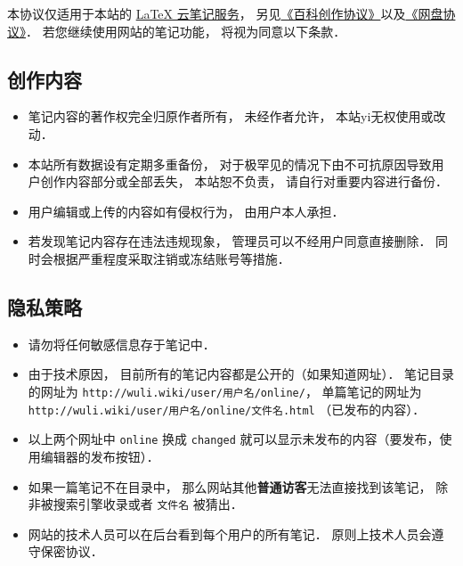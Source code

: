 
本协议仅适用于本站的 \href{http://example.com}{LaTeX 云笔记服务}， 另见\href{http://wuli.wiki/online/licens.html}{《百科创作协议》}以及\href{http://www.example.com}{《网盘协议》}． 若您继续使用网站的笔记功能， 将视为同意以下条款．

\subsection{创作内容}
\begin{itemize}
\item 笔记内容的著作权完全归原作者所有， 未经作者允许， 本站yi无权使用或改动．
\item 本站所有数据设有定期多重备份， 对于极罕见的情况下由不可抗原因导致用户创作内容部分或全部丢失， 本站恕不负责， 请自行对重要内容进行备份．
\item 用户编辑或上传的内容如有侵权行为， 由用户本人承担．
\item 若发现笔记内容存在违法违规现象， 管理员可以不经用户同意直接删除． 同时会根据严重程度采取注销或冻结账号等措施．
\end{itemize}

\subsection{隐私策略}
\begin{itemize}
\item 请勿将任何敏感信息存于笔记中．
\item 由于技术原因， 目前所有的笔记内容都是公开的（如果知道网址）． 笔记目录的网址为 \verb|http://wuli.wiki/user/用户名/online/|， 单篇笔记的网址为 \verb|http://wuli.wiki/user/用户名/online/文件名.html| （已发布的内容）．
\item 以上两个网址中 \verb|online| 换成 \verb|changed| 就可以显示未发布的内容（要发布，使用编辑器的发布按钮）．
\item 如果一篇笔记不在目录中， 那么网站其他\textbf{普通访客}无法直接找到该笔记， 除非被搜索引擎收录或者 \verb|文件名| 被猜出．
\item 网站的技术人员可以在后台看到每个用户的所有笔记． 原则上技术人员会遵守保密协议．
\end{itemize}
